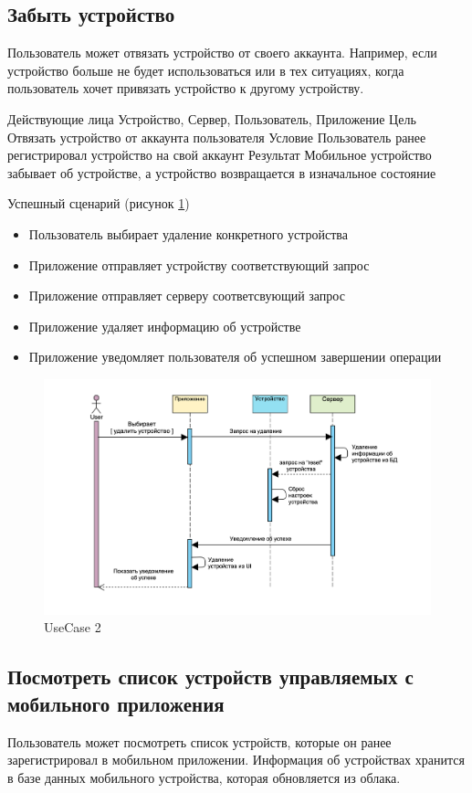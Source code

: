 \subsection{Забыть устройство}
Пользователь может отвязать устройство от своего аккаунта. Например, если устройство больше не будет использоваться или в тех ситуациях, когда пользователь хочет привязать устройство к другому устройству.

Действующие лица	Устройство, Сервер, Пользователь, Приложение
Цель	Отвязать устройство от аккаунта пользователя
Условие	Пользователь ранее регистрировал устройство на свой аккаунт
Результат	Мобильное устройство забывает об устройстве, а устройство возвращается в изначальное состояние

Успешный сценарий (рисунок \ref{fig:pic_useCase2})
\begin{itemize}
    \item Пользователь выбирает удаление конкретного устройства
    \item Приложение отправляет устройству соответствующий запрос
    \item Приложение отправляет серверу соответсвующий запрос
    \item Приложение удаляет информацию об устройстве
    \item Приложение уведомляет пользователя об успешном завершении операции
\end{itemize}

\begin{figure}[ht]
   \centering
   \includegraphics[scale=.5]{figures/pic_useCase2}
    \caption{UseCase 2}
    \label{fig:pic_useCase2}
\end{figure}

\subsection{Посмотреть список устройств управляемых с мобильного приложения}
Пользователь может посмотреть список устройств, которые он ранее зарегистрировал в мобильном приложении. Информация об устройствах хранится в базе данных мобильного устройства, которая обновляется из облака.

